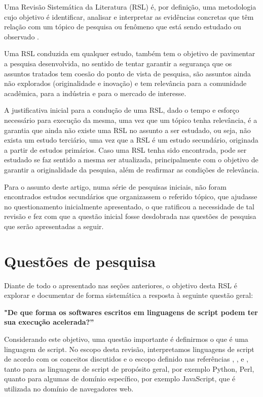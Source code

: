 \documentclass[sigconf]{acmart}
\begin{document}
Uma Revisão Sistemática da Literatura (RSL) é, por definição, uma metodologia cujo objetivo é identificar, analisar e interpretar as evidências concretas que têm relação com um tópico de pesquisa ou fenômeno que está sendo estudado ou observado \cite{nakagawa2017revisao}.

Uma RSL conduzida em qualquer estudo, também tem o objetivo de pavimentar a pesquisa desenvolvida, no sentido de tentar garantir a segurança que os assuntos tratados tem coesão do ponto de vista de pesquisa, são assuntos ainda não explorados (originalidade e inovação) e tem relevância para a comunidade acadêmica, para a indústria e para o mercado de interesse.

A justificativa inicial para a condução de uma RSL, dado o tempo e esforço necessário para execução da mesma, uma vez que um tópico tenha relevância, é a garantia que ainda não existe uma RSL no assunto a ser estudado, ou seja, não exista um estudo terciário, uma vez que a RSL é um estudo secundário, originada a partir de estudos primários. Caso uma RSL tenha sido encontrada, pode ser estudado se faz sentido a mesma ser atualizada, principalmente com o objetivo de garantir a originalidade da pesquisa, além de reafirmar as condições de relevância.

Para o assunto deste artigo, numa série de pesquisas iniciais, não foram encontrados estudos secundários que organizassem o referido tópico, que ajudasse no questionamento inicialmente apresentado, o que ratificou a necessidade de tal revisão e fez com que a questão inicial fosse desdobrada nas questões de pesquisa que serão apresentadas a seguir.


\section{Questões de pesquisa}
Diante de todo o apresentado nas seções anteriores, o objetivo desta RSL é explorar e documentar de forma sistemática a resposta à seguinte questão geral: 

\textbf{"De que forma os softwares escritos em linguagens de script podem ter sua execução acelerada?”}

Considerando este objetivo, uma questão importante é definirmos o que é uma linguagem de script. No escopo desta revisão, interpretamos linguagens de script de acordo com os conceitos discutidos e o escopo definido nas referências \cite{loui2008praise}, \cite{van1998glue}, \cite{WikipediaScriptingLanguage:2020} e \cite{WikipediaListofProgrammingLanguagesbyType:2020}, tanto para as linguagens de script de propósito geral, por exemplo Python, Perl, quanto para algumas de domínio específico, por exemplo JavaScript, que é utilizada no domínio de navegadores web.
\end{document}
